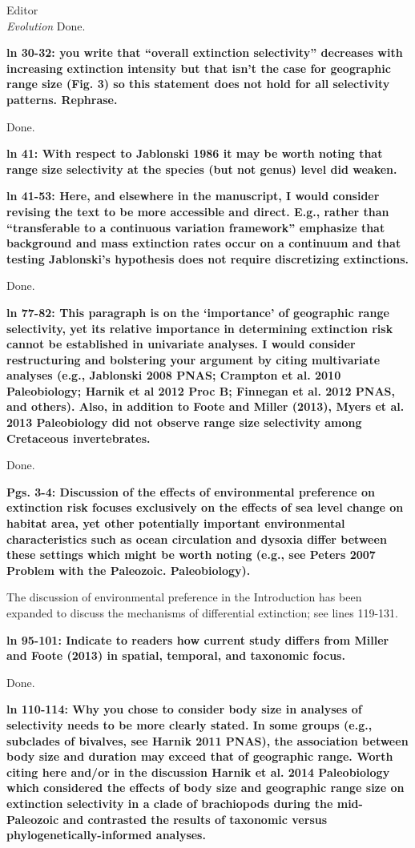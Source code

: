 \documentclass{letter}
\begin{document}
\begin{letter}{Editor \\ \textit{Evolution}}
  Done.

  \textbf{ln 30-32: you write that “overall extinction selectivity” decreases with increasing extinction intensity but that isn’t the case for geographic range size (Fig. 3) so this statement does not hold for all selectivity patterns. Rephrase.}

  Done.

  \textbf{ln 41: With respect to Jablonski 1986 it may be worth noting that range size selectivity at the species (but not genus) level did weaken.}


  \textbf{ln 41-53: Here, and elsewhere in the manuscript, I would consider revising the text to be more accessible and direct. E.g., rather than “transferable to a continuous variation framework” emphasize that background and mass extinction rates occur on a continuum and that testing Jablonski’s hypothesis does not require discretizing extinctions.}

  Done.

  \textbf{ln 77-82: This paragraph is on the ‘importance’ of geographic range selectivity, yet its relative importance in determining extinction risk cannot be established in univariate analyses. I would consider restructuring and bolstering your argument by citing multivariate analyses (e.g., Jablonski 2008 PNAS; Crampton et al. 2010 Paleobiology; Harnik et al 2012 Proc B; Finnegan et al. 2012 PNAS, and others). Also, in addition to Foote and Miller (2013), Myers et al. 2013 Paleobiology did not observe range size selectivity among Cretaceous invertebrates.}

  Done.

  \textbf{Pgs. 3-4: Discussion of the effects of environmental preference on extinction risk focuses exclusively on the effects of sea level change on habitat area, yet other potentially important environmental characteristics such as ocean circulation and dysoxia differ between these settings which might be worth noting (e.g., see Peters 2007 Problem with the Paleozoic. Paleobiology).}

  The discussion of environmental preference in the Introduction has been expanded to discuss the mechanisms of differential extinction; see lines 119-131.


  \textbf{ln 95-101: Indicate to readers how current study differs from Miller and Foote (2013) in spatial, temporal, and taxonomic focus.}

  Done.

  \textbf{ln 110-114: Why you chose to consider body size in analyses of selectivity needs to be more clearly stated. In some groups (e.g., subclades of bivalves, see Harnik 2011 PNAS), the association between body size and duration may exceed that of geographic range. Worth citing here and/or in the discussion Harnik et al. 2014 Paleobiology which considered the effects of body size and geographic range size on extinction selectivity in a clade of brachiopods during the mid-Paleozoic and contrasted the results of taxonomic versus phylogenetically-informed analyses.}


\end{letter}
\end{document}

